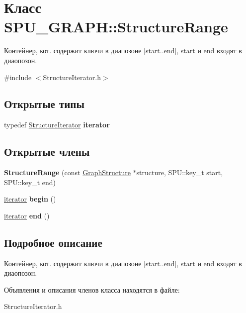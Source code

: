 \hypertarget{class_s_p_u___g_r_a_p_h_1_1_structure_range}{}\section{Класс S\+P\+U\+\_\+\+G\+R\+A\+PH\+:\+:Structure\+Range}
\label{class_s_p_u___g_r_a_p_h_1_1_structure_range}


Контейнер, кот. содержит ключи в диапозоне \mbox{[}start..end\mbox{]}, start и end входят в диаопозон.  




{\ttfamily \#include $<$Structure\+Iterator.\+h$>$}

\subsection*{Открытые типы}
\begin{DoxyCompactItemize}
\item 
\mbox{\label{class_s_p_u___g_r_a_p_h_1_1_structure_range_a952af08b4955e6cd840cb86cfa707685}} 
typedef \hyperlink{class_s_p_u___g_r_a_p_h_1_1_structure_iterator}{Structure\+Iterator} {\bfseries iterator}
\end{DoxyCompactItemize}
\subsection*{Открытые члены}
\begin{DoxyCompactItemize}
\item 
\mbox{\label{class_s_p_u___g_r_a_p_h_1_1_structure_range_a0e7272cf854f063e26354cbdca78ae82}} 
{\bfseries Structure\+Range} (const \hyperlink{class_s_p_u___g_r_a_p_h_1_1_graph_structure}{Graph\+Structure} $\ast$structure, S\+P\+U\+::key\+\_\+t start, S\+P\+U\+::key\+\_\+t end)
\item 
\mbox{\label{class_s_p_u___g_r_a_p_h_1_1_structure_range_ae01654e46347e70c9e71743db1c170c0}} 
\hyperlink{class_s_p_u___g_r_a_p_h_1_1_structure_iterator}{iterator} {\bfseries begin} ()
\item 
\mbox{\label{class_s_p_u___g_r_a_p_h_1_1_structure_range_a5f3b36929787a423acd58f4836d54b38}} 
\hyperlink{class_s_p_u___g_r_a_p_h_1_1_structure_iterator}{iterator} {\bfseries end} ()
\end{DoxyCompactItemize}


\subsection{Подробное описание}
Контейнер, кот. содержит ключи в диапозоне \mbox{[}start..end\mbox{]}, start и end входят в диаопозон. 

Объявления и описания членов класса находятся в файле\+:\begin{DoxyCompactItemize}
\item 
Structure\+Iterator.\+h\end{DoxyCompactItemize}
